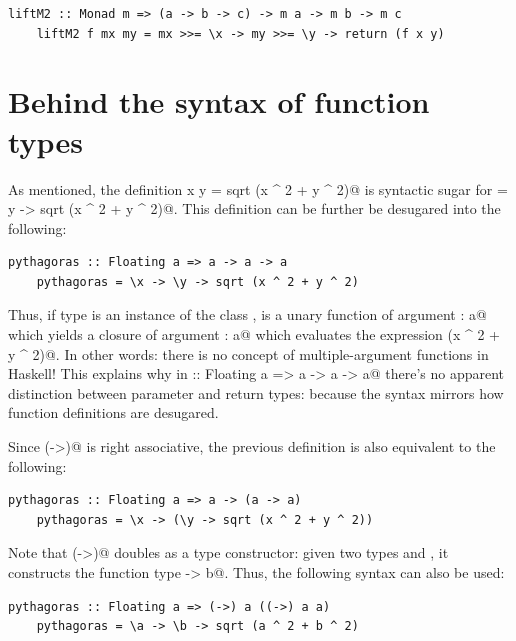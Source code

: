 \documentclass[UdineBachThesis,american,11pt]{PhdThesis}
\begin{document}
  \begin{lstlisting}[gobble=4,basicstyle=\ttfamily\small]
    liftM2 :: Monad m => (a -> b -> c) -> m a -> m b -> m c
    liftM2 f mx my = mx >>= \x -> my >>= \y -> return (f x y)
  \end{lstlisting}

  \section{Behind the syntax of function types}

  As mentioned, the definition
  \lstinline@pythagoras x y = sqrt (x ^ 2 + y ^ 2)@ is syntactic sugar for
  \lstinline@pythagoras = \x y -> sqrt (x ^ 2 + y ^ 2)@. This definition can be
  further be desugared into the following:

  \begin{lstlisting}[gobble=4,basicstyle=\ttfamily\small]
    pythagoras :: Floating a => a -> a -> a
    pythagoras = \x -> \y -> sqrt (x ^ 2 + y ^ 2)
  \end{lstlisting}

  Thus, if type \lstinline@a@ is an instance of the class \lstinline@Floating@,
  \lstinline@pythagoras@ is a unary function of argument \lstinline@x : a@ which
  yields a closure of argument \lstinline@y : a@ which evaluates the expression
  \lstinline@sqrt (x ^ 2 + y ^ 2)@. In other words: there is no concept of
  multiple-argument functions in Haskell! This explains why in
  \lstinline@pythagoras :: Floating a => a -> a -> a@ there's no apparent
  distinction between parameter and return types: because the syntax mirrors how
  function definitions are desugared.

  Since \lstinline@(->)@ is right associative, the previous definition is also
  equivalent to the following:

  \begin{lstlisting}[gobble=4,basicstyle=\ttfamily\small]
    pythagoras :: Floating a => a -> (a -> a)
    pythagoras = \x -> (\y -> sqrt (x ^ 2 + y ^ 2))
  \end{lstlisting}

  Note that \lstinline@(->)@ doubles as a type constructor: given two types
  \lstinline@a@ and \lstinline@b@, it constructs the function type
  \lstinline@a -> b@. Thus, the following syntax can also be used:

  \begin{lstlisting}[gobble=4,basicstyle=\ttfamily\small]
    pythagoras :: Floating a => (->) a ((->) a a)
    pythagoras = \a -> \b -> sqrt (a ^ 2 + b ^ 2)
  \end{lstlisting}
\end{document}
